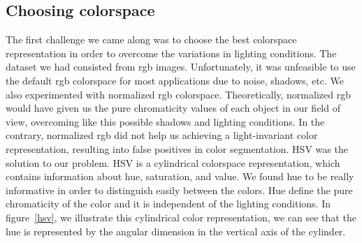 \documentclass[	DIV=calc,%
							paper=a4,%
							fontsize=9pt,%
							twocolumn]{scrartcl}	 					%
\begin{document}
\subsection{Choosing colorspace}
The first challenge we came along was to choose the best colorspace representation in order to overcome the variations in lighting conditions. The dataset we had consisted from rgb images. Unfortunately, it was unfeasible to use the default rgb colorspace for most applications due to noise, shadows, etc. We also experimented with normalized rgb colorspace. Theoretically,  normalized rgb would have given us the pure chromaticity values of each object in our field of view, overcoming like this possible shadows and lighting conditions. In the contrary, normalized rgb did not help us achieving a light-invariant color representation, resulting into false positives in color segmentation. HSV was the solution to our problem. HSV is a cylindrical colorspace representation, which contains information about hue, saturation, and value. We found hue to be really informative in order to distinguish  easily between the colors. Hue define the pure chromaticity of the color and it is independent of the lighting conditions. In figure~\ref{hsv}, we illustrate this cylindrical color representation, we can see that the hue is represented by the angular dimension in the vertical axis of the cylinder. 
\end{document}

